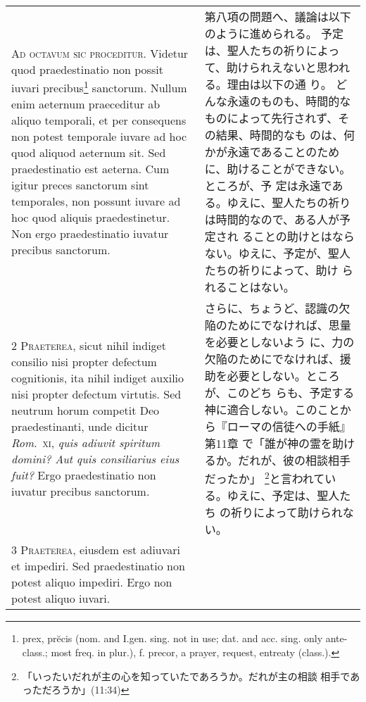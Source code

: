\documentclass[10pt]{jsarticle} %
\begin{document}
\begin{longtable}{p{21em}p{21em}}

{\Huge A}{\scshape d octavum sic proceditur}. Videtur quod
praedestinatio non possit iuvari precibus\footnote
{prex, pr\u{e}cis (nom. and
I.gen. sing. not in use; dat. and acc. sing. only ante-class.; most freq. in plur.), f. precor, a prayer, request, entreaty (class.). 
} sanctorum. Nullum enim
aeternum praeceditur ab aliquo temporali, et per consequens non potest
temporale iuvare ad hoc quod aliquod aeternum sit. Sed praedestinatio
est aeterna. Cum igitur preces sanctorum sint temporales, non possunt
iuvare ad hoc quod aliquis praedestinetur. Non ergo praedestinatio
iuvatur precibus sanctorum.


&

第八項の問題へ、議論は以下のように進められる。
予定は、聖人たちの祈りによって、助けられえないと思われる。理由は以下の通
 り。
どんな永遠のものも、時間的なものによって先行されず、その結果、時間的なも
 のは、何かが永遠であることのために、助けることができない。ところが、予
 定は永遠である。ゆえに、聖人たちの祈りは時間的なので、ある人が予定され
 ることの助けとはならない。ゆえに、予定が、聖人たちの祈りによって、助け
 られることはない。


\\


{\scshape 2 Praeterea}, sicut nihil indiget consilio
nisi propter defectum cognitionis, ita nihil indiget auxilio nisi
propter defectum virtutis. Sed neutrum horum competit Deo
praedestinanti, unde dicitur {\itshape Rom}.~{\scshape xi}, {\itshape quis adiuvit spiritum domini? Aut
quis consiliarius eius fuit?} Ergo praedestinatio non iuvatur precibus
sanctorum.


&

さらに、ちょうど、認識の欠陥のためにでなければ、思量を必要としないよう
 に、力の欠陥のためにでなければ、援助を必要としない。ところが、このどち
 らも、予定する神に適合しない。このことから『ローマの信徒への手紙』第11章
 で「誰が神の霊を助けるか。だれが、彼の相談相手だったか」
 \footnote{「いったいだれが主の心を知っていたであろうか。だれが主の相談
 相手であっただろうか」(11:34)}と言われている。ゆえに、予定は、聖人たち
 の祈りによって助けられない。


\\


{\scshape 3 Praeterea}, eiusdem est adiuvari et
impediri. Sed praedestinatio non potest aliquo impediri. Ergo non potest
aliquo iuvari.


&


\end{longtable}
\end{document}
